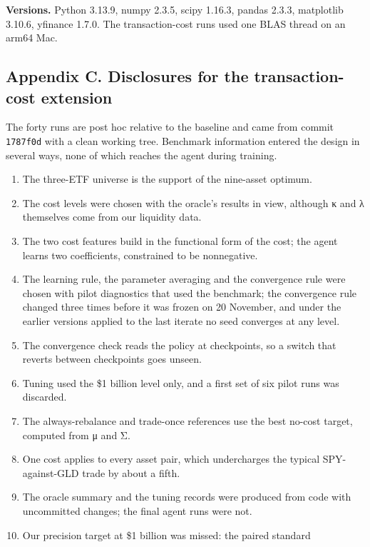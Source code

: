 \documentclass[
  11pt]{article}
\newcounter{none} %
\providecommand{\tightlist}{%
  \setlength{\itemsep}{0pt}\setlength{\parskip}{0pt}}
\begin{document}
\textbf{Versions.} Python 3.13.9, numpy 2.3.5, scipy 1.16.3, pandas
2.3.3, matplotlib 3.10.6, yfinance 1.7.0. The transaction-cost runs used
one BLAS thread on an arm64 Mac.

\subsection{Appendix C. Disclosures for the transaction-cost
extension}\label{appendix-c.-disclosures-for-the-transaction-cost-extension}

The forty runs are post hoc relative to the baseline and came from
commit \texttt{1787f0d} with a clean working tree. Benchmark information
entered the design in several ways, none of which reaches the agent
during training.

\begin{enumerate}
\def\labelenumi{\arabic{enumi}.}
\tightlist
\item
  The three-ETF universe is the support of the nine-asset optimum.
\item
  The cost levels were chosen with the oracle's results in view,
  although κ and λ themselves come from our liquidity data.
\item
  The two cost features build in the functional form of the cost; the
  agent learns two coefficients, constrained to be nonnegative.
\item
  The learning rule, the parameter averaging and the convergence rule
  were chosen with pilot diagnostics that used the benchmark; the
  convergence rule changed three times before it was frozen on 20
  November, and under the earlier versions applied to the last iterate
  no seed converges at any level.
\item
  The convergence check reads the policy at checkpoints, so a switch
  that reverts between checkpoints goes unseen.
\item
  Tuning used the \$1 billion level only, and a first set of six pilot
  runs was discarded.
\item
  The always-rebalance and trade-once references use the best no-cost
  target, computed from μ and Σ.
\item
  One cost applies to every asset pair, which undercharges the typical
  SPY-against-GLD trade by about a fifth.
\item
  The oracle summary and the tuning records were produced from code with
  uncommitted changes; the final agent runs were not.
\item
  Our precision target at \$1 billion was missed: the paired standard

\end{enumerate}
\end{document}
